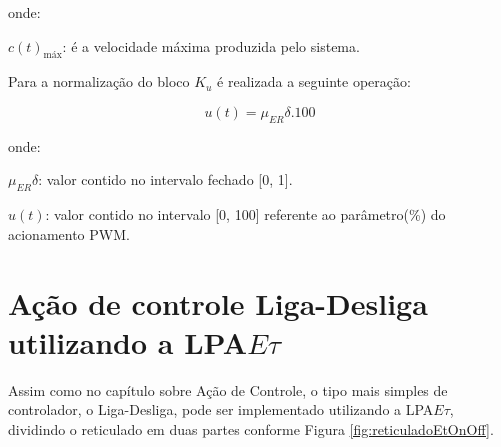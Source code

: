 onde:

$c(t)_{\text{máx}}$: é a velocidade máxima produzida pelo sistema.


Para a normalização do bloco $K_u$ é realizada a seguinte operação:

\begin{equation}
u(t) = \mu_{ER}\delta . 100
\end{equation}

onde:

$\mu_{ER}\delta$: valor contido no intervalo fechado [0, 1].

$u(t)$: valor contido no intervalo [0, 100] 
referente ao parâmetro(\%) do acionamento PWM.




\newpage


\section{Ação de controle Liga-Desliga utilizando a LPA$E\tau$}

Assim como no capítulo sobre Ação de Controle, 
o tipo mais simples de controlador, o Liga-Desliga,
pode ser implementado utilizando a 
LPA$E\tau$, 
dividindo o reticulado em duas partes conforme 
Figura \ref{fig:reticuladoEtOnOff}.





